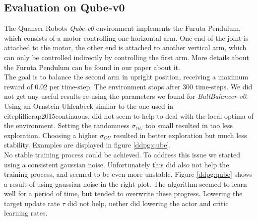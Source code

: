 \subsection{Evaluation on Qube-v0}
The Quanser Robots \textit{Qube-v0} environment implements the Furuta Pendulum, which consists of a motor controlling one horizontal arm. One end of the joint is attached to the motor, the other end is attached to another vertical arm, which can only be controlled indirectly by controlling the first arm. More details about the Furuta Pendulum can be found in our paper about it.\\
The goal is to balance the second arm in upright position, receiving a maximum reward of 0.02 per time-step. The environment stops after 300 time-steps.
We did not get any useful results re-using the parameters we found for \textit{BallBalancer-v0}. Using an Ornstein Uhlenbeck similar to the one used in citep{lillicrap2015continuous}, did not seem to help to deal with the local optima of the environment. Setting the randomness $\sigma_{OU}$ too small resulted in too less exploration. Choosing a higher $\sigma_{OU}$ resulted in better exploration but much less stability. Examples are displayed in figure \ref{ddpg:qube}.\\
No stable training process could be achieved. To address this issue we started using a consistent gaussian noise. Unfortunately this did also not help the training process, and seemed to be even more unstable. Figure \ref{ddpg:qube} shows a result of using gaussian noise in the right plot. The algorithm seemed to learn well for a period of time, but tended to overwrite these progress. Lowering the target update rate $\tau$ did not help, nether did lowering the actor and critic learning rates.
